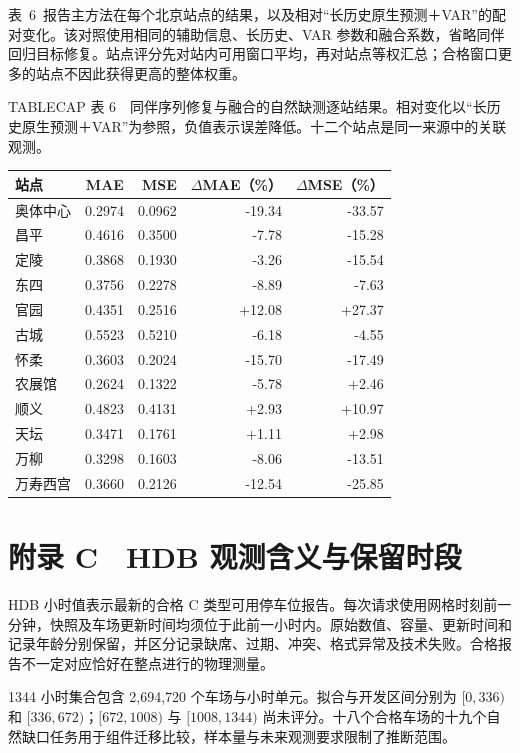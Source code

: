 表~6~报告主方法在每个北京站点的结果，以及相对“长历史原生预测＋VAR”的配对变化。该对照使用相同的辅助信息、长历史、VAR 参数和融合系数，省略同伴回归目标修复。站点评分先对站内可用窗口平均，再对站点等权汇总；合格窗口更多的站点不因此获得更高的整体权重。



TABLECAP 表 6　同伴序列修复与融合的自然缺测逐站结果。相对变化以“长历史原生预测＋VAR”为参照，负值表示误差降低。十二个站点是同一来源中的关联观测。

\begin{tabular}{lrrrr}
\toprule
站点 & MAE & MSE & $\Delta$MAE（\%） & $\Delta$MSE（\%）\\
\midrule
奥体中心 & 0.2974 & 0.0962 & -19.34 & -33.57 \\
昌平 & 0.4616 & 0.3500 & -7.78 & -15.28 \\
定陵 & 0.3868 & 0.1930 & -3.26 & -15.54 \\
东四 & 0.3756 & 0.2278 & -8.89 & -7.63 \\
官园 & 0.4351 & 0.2516 & +12.08 & +27.37 \\
古城 & 0.5523 & 0.5210 & -6.18 & -4.55 \\
怀柔 & 0.3603 & 0.2024 & -15.70 & -17.49 \\
农展馆 & 0.2624 & 0.1322 & -5.78 & +2.46 \\
顺义 & 0.4823 & 0.4131 & +2.93 & +10.97 \\
天坛 & 0.3471 & 0.1761 & +1.11 & +2.98 \\
万柳 & 0.3298 & 0.1603 & -8.06 & -13.51 \\
万寿西宫 & 0.3660 & 0.2126 & -12.54 & -25.85 \\
\bottomrule

\end{tabular}



\section{附录 C　HDB 观测含义与保留时段}


HDB 小时值表示最新的合格 C 类型可用停车位报告。每次请求使用网格时刻前一分钟，快照及车场更新时间均须位于此前一小时内。原始数值、容量、更新时间和记录年龄分别保留，并区分记录缺席、过期、冲突、格式异常及技术失败。合格报告不一定对应恰好在整点进行的物理测量。

1344 小时集合包含 2,694,720 个车场与小时单元。拟合与开发区间分别为 $[0,336)$ 和 $[336,672)$；$[672,1008)$ 与 $[1008,1344)$ 尚未评分。十八个合格车场的十九个自然缺口任务用于组件迁移比较，样本量与未来观测要求限制了推断范围。

